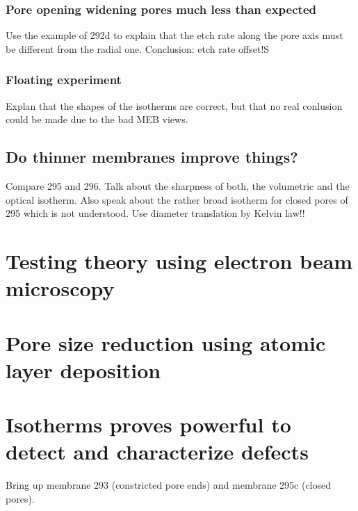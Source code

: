 \documentclass[../thesis.tex]{subfiles}
\begin{document}
                \subsubsection{Pore opening widening pores much less than expected}
                \label{subsec:pore-opening-pore-widening}

                  Use the example of 292d to explain that the etch rate along the pore axis must be different from the radial one. Conclusion: etch rate offset!S


                \subsubsection{Floating experiment}
                \label{subsec:floating-experiment}

                  Explan that the shapes of the isotherms are correct, but that no real conlusion could be made due to the bad MEB views.



        \subsection{Do thinner membranes improve things?}
        \label{sec:thinner-membranes}

          Compare 295 and 296. Talk about the sharpness of both, the volumetric and the optical isotherm. Also speak about the rather broad isotherm for closed pores of 295 which is not understood. Use diameter translation by Kelvin law!!


      \section{Testing theory using electron beam microscopy}
      \label{sec:testing-theory}


      \section{Pore size reduction using atomic layer deposition}


      \section{Isotherms proves powerful to detect and characterize defects}
      \label{sec:theory-and-defects}

      Bring up membrane 293 (constricted pore ends) and membrane 295c (closed pores).
\end{document}
